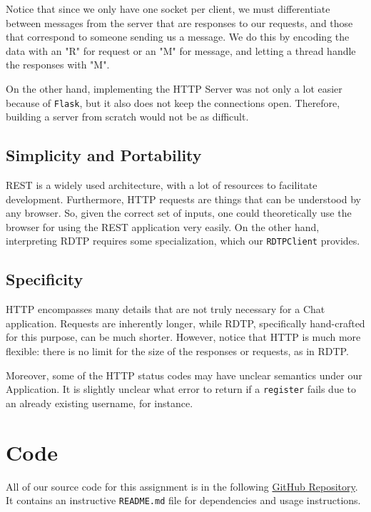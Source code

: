 \documentclass[10pt]{article}
\begin{document}
\medskip

Notice that since we only have one socket per client, we must differentiate between messages
from the server that are responses to our requests, and those that correspond to someone
sending us a message. We do this by encoding the data with an "R" for request or an "M" for
message, and letting a thread handle the responses with "M".

\medskip

On the other hand, implementing the HTTP Server was not only a lot easier because of \verb|Flask|,
but it also does not keep the connections open. Therefore, building a server from scratch would not
be as difficult.

\subsection{Simplicity and Portability}

REST is a widely used architecture, with a lot of resources to facilitate development. Furthermore,
HTTP requests are things that can be understood by any browser. So, given the correct set of inputs,
one could theoretically use the browser for using the REST application very easily. On the other hand,
interpreting RDTP requires some specialization, which our \verb|RDTPClient| provides.

\subsection{Specificity}

HTTP encompasses many details that are not truly necessary for a Chat application.
Requests are inherently longer, while RDTP, specifically hand-crafted for this purpose, can be much
shorter. However, notice that HTTP is much more flexible: there is no limit for the size of the
responses or requests, as in RDTP.

\medskip

Moreover, some of the HTTP status codes may have unclear semantics under our Application. It is slightly
unclear what error to return if a \verb|register| fails due to an already existing username, for instance.

\section{Code}

All of our source code for this assignment is in the following
\href{https://github.com/gablg1/http-sucks-chat}{GitHub Repository}.
It contains an instructive \verb|README.md| file for dependencies and usage instructions.
\end{document}
